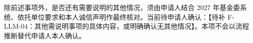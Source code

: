 \justifying
\NSFCBodyText

除前述事项外，是否还有需要说明的其他情况，须由申请人结合 2027 年基金委系统、依托单位要求和本人诚信声明作最终核对。当前待申请人确认：【待补 F-LLM-04：其他需说明事项的具体内容，或明确确认无其他情况】。本项不会以流程推断替代申请人本人确认。
